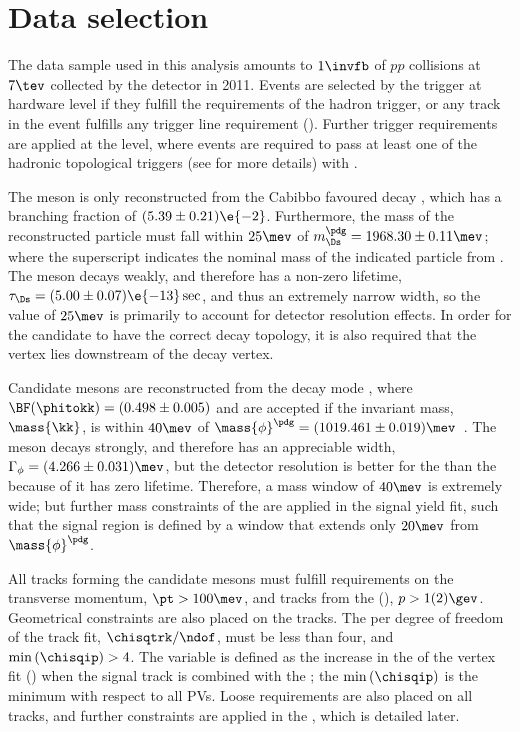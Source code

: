 \section{Data selection}
\label{sec:dsphi:sel}

The data sample used in this analysis amounts to
$1\invfb$ of $pp$ collisions at $7\tev$ collected by the \lhcb detector in 2011.
Events are selected by the trigger at hardware level if they fulfill the requirements of the \lone
hadron trigger, or any track in the event fulfills any \lone trigger line requirement (\tis).
Further trigger requirements are applied at the \hlttwo level, where events are required to pass at
least one of the hadronic topological triggers (see  for more details) with
\tos.

The \Ds meson is only reconstructed from the Cabibbo favoured decay \dstokkpi,
which has a branching fraction of $(5.39\pm0.21)\e{-2}$.
Furthermore, the mass of the reconstructed particle must fall within $25\mev$ of
$m_{\Ds}^\pdg=1968.30\pm0.11\mev$; where the superscript \pdg indicates the nominal mass of the
indicated particle from .
The \Ds meson decays weakly, and therefore has a non-zero lifetime,
$\tau_{\Ds}=(5.00\pm0.07)\e{-13}\sec$, and thus an extremely narrow width, so the value of $25\mev$
is primarily to account for detector resolution effects.
In order for the candidate to have the correct decay topology, it is also required that the \Ds
vertex lies downstream of the \Bp decay vertex.

Candidate \phii mesons are reconstructed from the decay mode \phitokk, where
$\BF(\phitokk)=(0.498\pm0.005)$ and are accepted if the
invariant \kk mass, $\mass{\kk}$, is within $40\mev$ of
$\mass{\phi}^\pdg=(1019.461\pm0.019)\mev$~\cite{PDG2012}.
The \phii meson decays strongly, and therefore has an appreciable width,
$\Gamma_\phi=(4.266\pm0.031)\mev$, but the detector resolution is better for the \phii than the \Ds
because of it has zero lifetime.
Therefore, a mass window of $40\mev$ is extremely wide; but further mass constraints of the \phii
are applied in the signal yield fit, such that the signal region is defined by a window that
extends only $20\mev$ from $\mass{\phi}^\pdg$.

All tracks forming the candidate mesons must fulfill requirements on the transverse momentum,
$\pt>100\mev$, and tracks from the \Ds(\phii), $p>1(2)\gev$.
Geometrical constraints are also placed on the tracks.
The \chisq per degree of freedom of the track fit, $\chisqtrk/\ndof$, must be less than four, and
$\min\left(\chisqip\right)>4$.
The variable \chisqip is defined as the increase in the \chisq of the vertex fit (\chisqvtx) when
the signal track is combined with the \pv; the $\min\left(\chisqip\right)$ is the minimum \chisqip
with respect to all \glspl{PV}.
Loose \pid requirements are also placed on all tracks, and further \pid constraints are applied in
the \bdt, which is detailed later.

